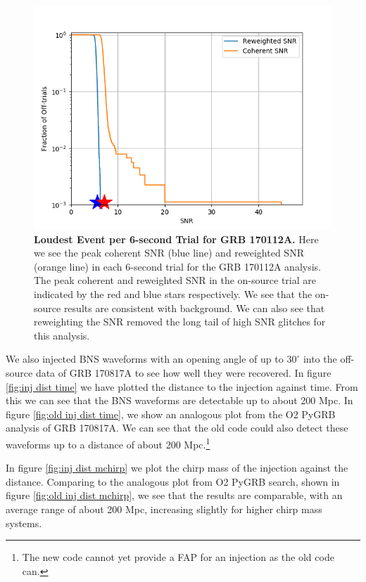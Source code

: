 \documentclass[11pt]{cuthesis}
\begin{document}
\begin{figure} %
\begin{center}
\includegraphics[width=0.8\linewidth]{binned_fap_with_signal_GRB170112A.png}
\end{center}
\caption{\textbf{Loudest Event per 6-second Trial for GRB 170112A.} Here we see the peak coherent SNR (blue line) and reweighted SNR (orange line) in each 6-second trial for the GRB 170112A analysis. The peak coherent and reweighted SNR in the on-source trial are indicated by the red and blue stars respectively. We see that the on-source results are consistent with background. We can also see that reweighting the SNR removed the long tail of high SNR glitches for this analysis. } 
\label{fig:snrs trials 170112A}
\end{figure}

We also injected BNS waveforms with an opening angle of up to $30^\circ$ into the off-source data of GRB 170817A to see how well they were recovered. In figure \ref{fig:inj dist time} we have plotted the distance to the injection against time. From this we can see that the BNS waveforms are detectable up to about 200 Mpc. In figure \ref{fig:old inj dist time}, we show an analogous plot from the O2 PyGRB analysis of GRB 170817A. We can see that the old code could also detect these waveforms up to a distance of about 200 Mpc.\footnote{The new code cannot yet provide a FAP for an injection as the old code can.}

In figure \ref{fig:inj dist mchirp} we plot the chirp mass of the injection against the distance. Comparing to the analogous plot from O2 PyGRB search, shown in figure \ref{fig:old inj dist mchirp}, we see that the results are comparable, with an average range of about 200 Mpc, increasing slightly for higher chirp mass systems.
\end{document}
